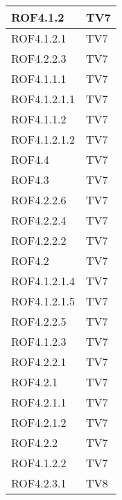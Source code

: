 \begin{center}
\begin{longtable}{|p{7cm}|p{7cm}|}
\midrule
ROF4.1.2
& TV7\\

\midrule
ROF4.1.2.1
& TV7\\

\midrule
ROF4.2.2.3
& TV7\\

\midrule
ROF4.1.1.1
& TV7\\

\midrule
ROF4.1.2.1.1
& TV7\\

\midrule
ROF4.1.1.2
& TV7\\

\midrule
ROF4.1.2.1.2
& TV7\\

\midrule
ROF4.4
& TV7\\

\midrule
ROF4.3
& TV7\\

\midrule
ROF4.2.2.6
& TV7\\

\midrule
ROF4.2.2.4
& TV7\\

\midrule
ROF4.2.2.2
& TV7\\

\midrule
ROF4.2
& TV7\\

\midrule
ROF4.1.2.1.4
& TV7\\

\midrule
ROF4.1.2.1.5
& TV7\\

\midrule
ROF4.2.2.5
& TV7\\

\midrule
ROF4.1.2.3
& TV7\\

\midrule
ROF4.2.2.1
& TV7\\

\midrule
ROF4.2.1
& TV7\\

\midrule
ROF4.2.1.1
& TV7\\

\midrule
ROF4.2.1.2
& TV7\\

\midrule
ROF4.2.2
& TV7\\

\midrule
ROF4.1.2.2
& TV7\\

\midrule
ROF4.2.3.1
& TV8\\


\end{longtable}
\end{center}

